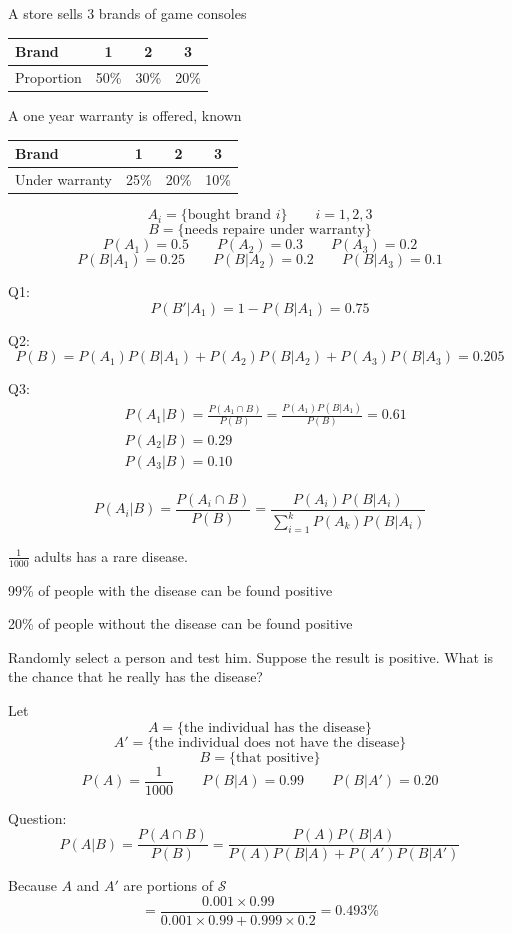 \begin{exmp}
A store sells 3 brands of game consoles

\begin{center}
 \begin{tabular}{l|ccc}
 \hline
 Brand & 1 & 2 & 3 \\
 \hline
 Proportion & 50\% & 30\% & 20\%\\
 \hline
 \end{tabular}  
\end{center}

A one year warranty is offered, known 

\begin{center}
    \begin{tabular}{l|ccc}
    \hline
    Brand & 1 & 2 & 3 \\
    \hline
    Under warranty & 25\% & 20\% & 10\%\\
    \hline
  \end{tabular}
\end{center}
  \[A_i=\{\text{bought brand }i\} \qquad i=1,2,3\]
  \[B=\{\text{needs repaire under warranty}\} \]
  \[P(A_1)=0.5 \qquad P(A_2)=0.3 \qquad P(A_3)=0.2\]
  \[P(B|A_1)=0.25 \qquad P(B|A_2)=0.2 \qquad P(B|A_3)=0.1\]
  
  Q1:\[P(B'|A_1)=1-P(B|A_1)=0.75\]

  Q2:\[P(B)=P(A_1)P(B|A_1)+P(A_2)P(B|A_2)+P(A_3)P(B|A_3)=0.205\]

  Q3:\begin{align*}
  &P(A_1|B)=\frac{P(A_1 \cap B)}{P(B)}=\frac{P(A_1)P(B|A_1)}{P(B)}=0.61\\
  &P(A_2|B)=0.29 \\
  &P(A_3|B)=0.10\\
  \end{align*}
\end{exmp}

\begin{theo} 
  \[P(A_i|B)=\frac{P(A_i \cap B)}{P(B)}=\frac{P(A_i)P(B|A_i)}{\sum_{i=1}^k P(A_k)P(B|A_i)}    \]
\end{theo}

\begin{exmp}
$\frac{1}{1000}$ adults has a rare disease.

99\% of people with the disease can be found positive

20\% of people without the disease can be found positive

Randomly select a person and test him. Suppose the result is positive. What is the chance that he really has the disease? 

Let
\[	A=\{\text{the individual has the disease} \}		\]
\[	A'=\{\text{the individual does not have the disease} \}		\]
\[	B=\{\text{that positive} \}		\]
\[	P(A)=\frac{1}{1000} \qquad P(B|A)=0.99 \qquad P(B|A')=0.20	\]

Question:
\[	P(A|B)=\frac{P(A \cap B)}{P(B)}=\frac{P(A)P(B|A)}{P(A)P(B|A)+P(A')P(B|A')}		\]

Because $A$ and $A'$ are portions of $\mathcal{S}$
\[	=\frac{0.001\times 0.99}{0.001\times 0.99+ 0.999\times 0.2}=0.493\%		\]
\end{exmp}
